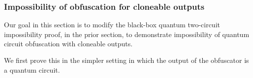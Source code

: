 \documentclass[11pt]{article}
\numberwithin{equation}{section}
\begin{document}
{%
%

\subsubsection{Impossibility of obfuscation for cloneable outputs}

Our goal in this section is to modify the black-box quantum two-circuit impossibility proof, in the prior section, to demonstrate impossibility of quantum circuit obfuscation with cloneable outputs.

We first prove this in the simpler setting in which the output of the obfuscator is a quantum circuit.

}
\end{document}

